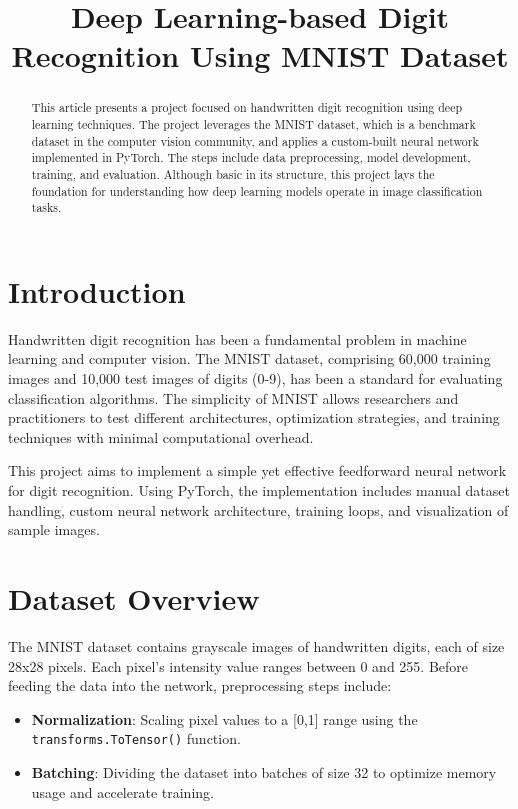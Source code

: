 \documentclass{article}
\title{Deep Learning-based Digit Recognition Using MNIST Dataset}
\author{}
\date{}
\begin{document}
\maketitle

\begin{abstract}
This article presents a project focused on handwritten digit recognition using deep learning techniques. The project leverages the MNIST dataset, which is a benchmark dataset in the computer vision community, and applies a custom-built neural network implemented in PyTorch. The steps include data preprocessing, model development, training, and evaluation. Although basic in its structure, this project lays the foundation for understanding how deep learning models operate in image classification tasks.
\end{abstract}

\section{Introduction}
Handwritten digit recognition has been a fundamental problem in machine learning and computer vision. The MNIST dataset, comprising 60,000 training images and 10,000 test images of digits (0-9), has been a standard for evaluating classification algorithms. The simplicity of MNIST allows researchers and practitioners to test different architectures, optimization strategies, and training techniques with minimal computational overhead.

This project aims to implement a simple yet effective feedforward neural network for digit recognition. Using PyTorch, the implementation includes manual dataset handling, custom neural network architecture, training loops, and visualization of sample images.

\section{Dataset Overview}
The MNIST dataset contains grayscale images of handwritten digits, each of size 28x28 pixels. Each pixel's intensity value ranges between 0 and 255. Before feeding the data into the network, preprocessing steps include:
\begin{itemize}
    \item \textbf{Normalization}: Scaling pixel values to a [0,1] range using the \texttt{transforms.ToTensor()} function.
    \item \textbf{Batching}: Dividing the dataset into batches of size 32 to optimize memory usage and accelerate training.
\end{itemize}
\end{document}
